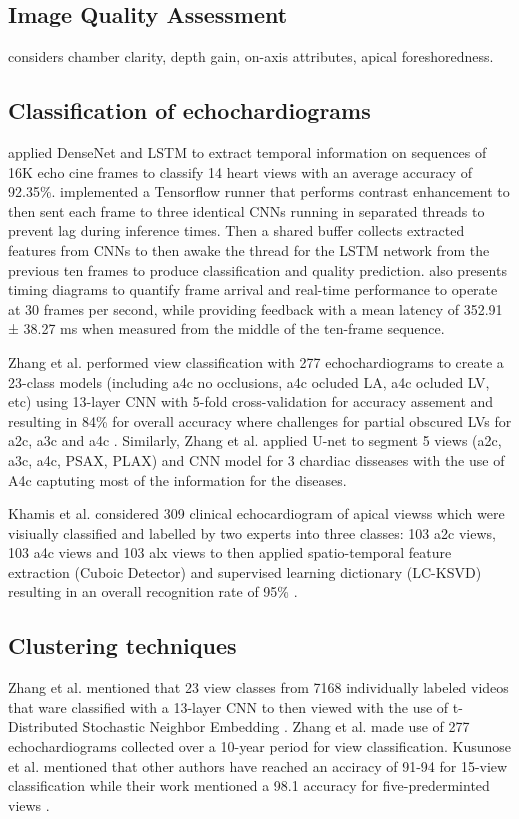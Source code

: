 \subsection{Image Quality Assessment}
\cite{labs2021_in_miua} considers chamber clarity, depth gain, on-axis attributes, apical foreshoredness.

\subsection{Classification of echochardiograms}
\cite{woudenberg2018} applied DenseNet and LSTM to extract temporal information on sequences of 16K echo cine frames to classify 14 heart views with an average accuracy of 92.35\%.
\cite{woudenberg2018} implemented a Tensorflow runner that performs contrast enhancement to then sent each frame to three identical CNNs running in separated threads to prevent lag during inference times.
Then a shared buffer collects extracted features from CNNs to then awake the thread for the LSTM network from the previous ten frames to produce classification and quality prediction.
\cite{woudenberg2018} also presents timing diagrams to quantify frame arrival and real-time performance to operate at 30 frames per second, while providing feedback with a mean latency of 352.91 ± 38.27 ms when measured from the middle of the ten-frame sequence.

Zhang et al. performed view classification with 277 echochardiograms to create a 23-class models (including a4c no occlusions, a4c ocluded LA, a4c ocluded LV, etc) using 13-layer CNN with 5-fold cross-validation for accuracy assement and resulting in 84\% for overall accuracy where challenges for partial obscured LVs for a2c, a3c and a4c \cite{zhang2018}.
Similarly, Zhang et al. applied U-net to segment 5 views (a2c, a3c, a4c, PSAX, PLAX) and CNN model for 3 chardiac disseases with the use of A4c captuting most of the information for the diseases.

Khamis et al. considered 309 clinical echocardiogram of apical viewss which were visiually classified and labelled by two experts into three classes: 103 a2c views, 103 a4c views and 103 alx views to then applied spatio-temporal feature extraction (Cuboic Detector) and supervised learning dictionary (LC-KSVD) resulting in an overall recognition rate of 95\% \cite{khamis2017}.

\subsection{Clustering techniques}
Zhang et al. mentioned that 23 view classes from 7168 individually labeled videos that ware classified with a 13-layer CNN to then viewed with the use of t-Distributed Stochastic Neighbor Embedding \cite{zhang2018}.
Zhang et al. made use of 277 echochardiograms collected over a 10-year period for view classification.
Kusunose et al. mentioned that other authors have reached an acciracy of 91-94 for 15-view classification while their work mentioned a 98.1 accuracy for five-prederminted views \cite{kusunose2021}.

